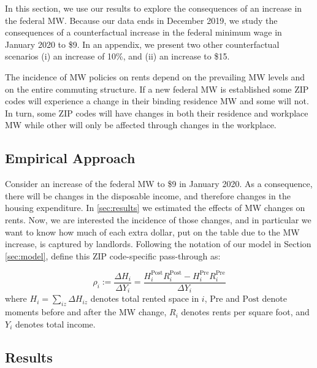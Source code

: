 
In this section, we use our results to explore the consequences of an increase
in the federal MW.
Because our data ends in December 2019, we study the consequences of a 
counterfactual increase in the federal minimum wage in January 2020 to \$9. 
In an appendix, we present two other counterfactual scenarios (i) an increase of 10\%, 
and (ii) an increase to \$15. 


The incidence of MW policies on rents depend on the prevailing MW levels and on
the entire commuting structure. If a new federal MW is established some ZIP 
codes will experience a change in their binding residence MW and some will not. In turn, 
some ZIP codes will have changes in both their residence and workplace MW while other 
will only be affected through changes in the workplace.



\subsection{Empirical Approach}

Consider an increase of the federal MW to \$9 in January 2020. As a consequence, there 
will be changes in the disposable income, and therefore changes in the housing expenditure.
In \ref{sec:results} we estimated the effects of MW changes on rents. Now, we are interested 
the incidence of those changes, and in particular we want to know how much of each extra 
dollar, put on the table due to the MW increase, is captured by landlords. Following the 
notation of our model in Section \ref{sec:model}, define this ZIP code-specific pass-through 
as:

\begin{equation}\label{eq:pass_through}
    \rho_i := \frac{\Delta H_i}{\Delta Y_i} 
            = \frac{H^{\text{Post}}_i R^{\text{Post}}_i - H^{\text{Pre}}_i R^{\text{Pre}}_i}{\Delta Y_i}
\end{equation}
where $H_i = \sum_{iz}\Delta H_{iz}$ denotes total rented space in $i$, 
$\text{Pre}$ and $\text{Post}$ denote moments before and after the MW change,
$R_i$ denotes rents per square foot, and 
$Y_i$ denotes total income.



\subsection{Results}


